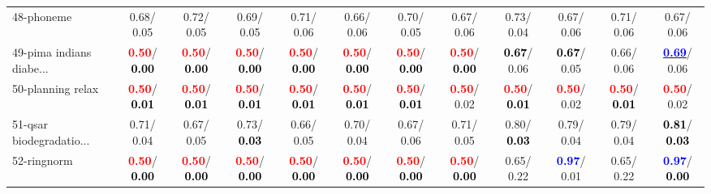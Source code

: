 \begin{table}[h]
\begin{center}
{\begin{tabular}{lc|c|c|c|c|c|c|c|c|c|c}
48-phoneme &   0.68/  0.05 &   0.72/  0.05 &   0.69/  0.05 &   0.71/  0.06 &   0.66/  0.06 &   0.70/  0.05 &   0.67/  0.06 &   0.73/  0.04 &   0.67/  0.06 &   0.71/  0.06 &   0.67/  0.06 \\
49-pima indians diabe... & \textcolor{red}{\textbf{  0.50}}/\textcolor{black}{\textbf{  0.00}} & \textcolor{red}{\textbf{  0.50}}/\textcolor{black}{\textbf{  0.00}} & \textcolor{red}{\textbf{  0.50}}/\textcolor{black}{\textbf{  0.00}} & \textcolor{red}{\textbf{  0.50}}/\textcolor{black}{\textbf{  0.00}} & \textcolor{red}{\textbf{  0.50}}/\textcolor{black}{\textbf{  0.00}} & \textcolor{red}{\textbf{  0.50}}/\textcolor{black}{\textbf{  0.00}} & \textcolor{red}{\textbf{  0.50}}/\textcolor{black}{\textbf{  0.00}} & \textcolor{black}{\textbf{  0.67}}/  0.06 & \textcolor{black}{\textbf{  0.67}}/  0.05 &   0.66/  0.06 & \underline{\textcolor{blue}{\textbf{  0.69}}}/  0.06 \\
50-planning relax & \textcolor{red}{\textbf{  0.50}}/\textcolor{black}{\textbf{  0.01}} & \textcolor{red}{\textbf{  0.50}}/\textcolor{black}{\textbf{  0.01}} & \textcolor{red}{\textbf{  0.50}}/\textcolor{black}{\textbf{  0.01}} & \textcolor{red}{\textbf{  0.50}}/\textcolor{black}{\textbf{  0.01}} & \textcolor{red}{\textbf{  0.50}}/\textcolor{black}{\textbf{  0.01}} & \textcolor{red}{\textbf{  0.50}}/\textcolor{black}{\textbf{  0.01}} & \textcolor{red}{\textbf{  0.50}}/  0.02 & \textcolor{red}{\textbf{  0.50}}/\textcolor{black}{\textbf{  0.01}} & \textcolor{red}{\textbf{  0.50}}/  0.02 & \textcolor{red}{\textbf{  0.50}}/\textcolor{black}{\textbf{  0.01}} & \textcolor{red}{\textbf{  0.50}}/  0.02 \\
51-qsar biodegradatio... &   0.71/  0.04 &   0.67/  0.05 &   0.73/\textcolor{black}{\textbf{  0.03}} &   0.66/  0.05 &   0.70/  0.04 &   0.67/  0.06 &   0.71/  0.05 &   0.80/\textcolor{black}{\textbf{  0.03}} &   0.79/  0.04 &   0.79/  0.04 & \textcolor{black}{\textbf{  0.81}}/\textcolor{black}{\textbf{  0.03}} \\
52-ringnorm & \textcolor{red}{\textbf{  0.50}}/\textcolor{black}{\textbf{  0.00}} & \textcolor{red}{\textbf{  0.50}}/\textcolor{black}{\textbf{  0.00}} & \textcolor{red}{\textbf{  0.50}}/\textcolor{black}{\textbf{  0.00}} & \textcolor{red}{\textbf{  0.50}}/\textcolor{black}{\textbf{  0.00}} & \textcolor{red}{\textbf{  0.50}}/\textcolor{black}{\textbf{  0.00}} & \textcolor{red}{\textbf{  0.50}}/\textcolor{black}{\textbf{  0.00}} & \textcolor{red}{\textbf{  0.50}}/\textcolor{black}{\textbf{  0.00}} &   0.65/  0.22 & \textcolor{blue}{\textbf{  0.97}}/  0.01 &   0.65/  0.22 & \textcolor{blue}{\textbf{  0.97}}/\textcolor{black}{\textbf{  0.00}} \\

\end{tabular}}
\end{center}
\end{table}
